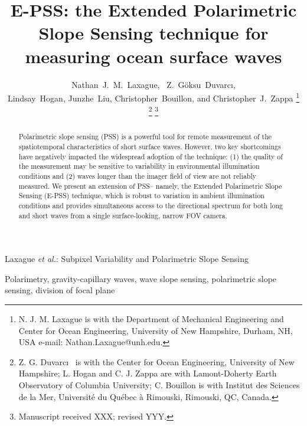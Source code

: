 \documentclass[letterpaper,journal]{IEEEtran}
\begin{document}
%
\title{E-PSS: the Extended Polarimetric Slope Sensing technique for measuring ocean surface waves}

\author{Nathan~J.~M.~Laxague,~
        Z.~G\"oksu~Duvarc\i,\\
        Lindsay~Hogan, Junzhe~Liu,
        Christopher~Bouillon, and Christopher~J.~Zappa%
\thanks{N. J. M. Laxague is with the Department
of Mechanical Engineering and Center for Ocean Engineering, University of New Hampshire, Durham, NH, USA e-mail: Nathan.Laxague@unh.edu.}%
\thanks{Z. G. Duvarc\i~ is with the Center for Ocean Engineering, University of New Hampshire; L. Hogan and C. J. Zappa are with Lamont-Doherty Earth Observatory of Columbia University; C. Bouillon is with Institut des Sciences de la Mer, Université du Québec à Rimouski, Rimouski, QC, Canada.}%
\thanks{Manuscript received XXX; revised YYY.}}

%
{Laxague \MakeLowercase{\textit{et al.}}: Subpixel Variability and Polarimetric Slope Sensing}

\maketitle

\begin{abstract}
Polarimetric slope sensing (PSS) is a powerful tool for remote measurement of the spatiotemporal characteristics of short surface waves. However, two key shortcomings have negatively impacted the widespread adoption of the technique: (1) the quality of the measurement may be sensitive to variability in environmental illumination conditions and (2) waves longer than the imager field of view are not reliably measured. We present an extension of PSS-- namely, the Extended Polarimetric Slope Sensing (E-PSS) technique, which is robust to variation in ambient illumination conditions and provides simultaneous access to the directional spectrum for both long and short waves from a single surface-looking, narrow FOV camera. 
\end{abstract}

\begin{IEEEkeywords}
Polarimetry, gravity-capillary waves, wave slope sensing, polarimetric slope sensing, division of focal plane
\end{IEEEkeywords}
\end{document}

